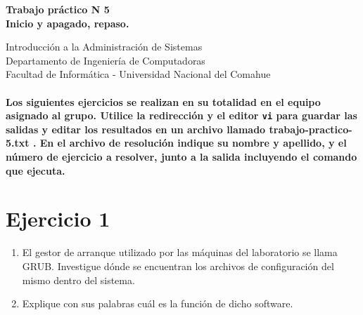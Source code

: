 \documentclass[12pt]{article}
\def\maketitle{

 \makeatletter
 {\color{bl} \centering \huge \sc \textbf{
Trabajo práctico N 5 \\
\large \vspace*{-8pt} \color{black} Inicio y apagado, repaso. 
 \vspace*{8pt} }\par}
 \makeatother


 \makeatletter
 {\centering \small 
	Introducción a la Administración de Sistemas \\
 	Departamento de Ingeniería de Computadoras \\
 	Facultad de Informática - Universidad Nacional del Comahue \\
 	\vspace{20pt} }
 \makeatother

}
\begin{document}
\thispagestyle{empty}
\maketitle
\setlength{\parindent}{0pt}

\paragraph{Los siguientes ejercicios se realizan en su totalidad en el equipo asignado al grupo.
Utilice la redirección y el editor \texttt{vi} para guardar las salidas y editar los resultados 
en un archivo llamado trabajo-practico-5.txt . En el archivo de resolución indique su nombre y apellido, 
y el número de ejercicio a resolver, junto a la salida incluyendo el comando que ejecuta. }

\section*{Ejercicio 1}

\begin{enumerate}
\item El gestor de arranque utilizado por las máquinas del laboratorio se llama GRUB. Investigue 
dónde se encuentran los archivos de configuración del mismo dentro del sistema. 
\item Explique con sus palabras cuál es la función de dicho software.
\end{enumerate}
\end{document}

